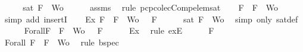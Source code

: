 \begin{isabellebody}
%
\isadelimproof
%
\endisadelimproof
%
\isatagproof
{}\isamarkupfalse%
\ {\isacharminus}\isanewline
\ \ \isamarkupfalse%
\ {\isachardoublequoteopen}sat\ {\isacharparenleft}{\isacharbraceleft}F{\isacharbraceright}\ {\isasymunion}\ Wo{\isacharparenright}{\isachardoublequoteclose}\isanewline
\ \ \ \ \isamarkupfalse%
\ assms{\isacharparenleft}{}{\isacharcomma}{}{\isacharcomma}{}{\isacharcomma}{}{\isacharparenright}\ \isamarkupfalse%
\ {\isacharparenleft}rule\ pcp{\isacharunderscore}colecComp{\isacharunderscore}elem{\isacharunderscore}sat{\isacharparenright}\isanewline
\ \ \isamarkupfalse%
\ {\isachardoublequoteopen}F\ {\isasymin}\ {\isacharbraceleft}F{\isacharbraceright}\ {\isasymunion}\ Wo{\isachardoublequoteclose}\isanewline
\ \ \ \ \isamarkupfalse%
\ {\isacharparenleft}simp\ add{\isacharcolon}\ insertI{}{\isacharparenright}\isanewline
\ \ \isamarkupfalse%
\ Ex{}{\isacharcolon}{\isachardoublequoteopen}{\isasymexists}{\isasymA}{\isachardot}\ {\isasymforall}F\ {\isasymin}\ {\isacharparenleft}{\isacharbraceleft}F{\isacharbraceright}\ {\isasymunion}\ Wo{\isacharparenright}{\isachardot}\ {\isasymA}\ {\isasymTurnstile}\ F{\isachardoublequoteclose}\isanewline
\ \ \ \ \isamarkupfalse%
\ {\isacartoucheopen}sat\ {\isacharparenleft}{\isacharbraceleft}F{\isacharbraceright}\ {\isasymunion}\ Wo{\isacharparenright}{\isacartoucheclose}\ \isamarkupfalse%
\ {\isacharparenleft}simp\ only{\isacharcolon}\ sat{\isacharunderscore}def{\isacharparenright}\isanewline
\ \ \isamarkupfalse%
\ {\isasymA}\ \ Forall{}{\isacharcolon}{\isachardoublequoteopen}{\isasymforall}F\ {\isasymin}\ {\isacharparenleft}{\isacharbraceleft}F{\isacharbraceright}\ {\isasymunion}\ Wo{\isacharparenright}{\isachardot}\ {\isasymA}\ {\isasymTurnstile}\ F{\isachardoublequoteclose}\isanewline
\ \ \ \ \isamarkupfalse%
\ Ex{}\ \isamarkupfalse%
\ {\isacharparenleft}rule\ exE{\isacharparenright}\isanewline
\ \ \isamarkupfalse%
\ {\isachardoublequoteopen}{\isasymA}\ {\isasymTurnstile}\ F{\isachardoublequoteclose}\isanewline
\ \ \ \ \isamarkupfalse%
\ Forall{}\ {\isacartoucheopen}F\ {\isasymin}\ {\isacharbraceleft}F{\isacharbraceright}\ {\isasymunion}\ Wo{\isacartoucheclose}\ \isamarkupfalse%
\ {\isacharparenleft}rule\ bspec{\isacharparenright}\isanewline

\end{isabellebody}

